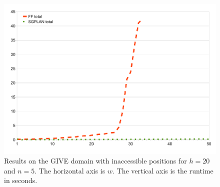 \begin{figure}
  \centering
  \includegraphics[width=0.85\columnwidth]{graph-exp4}
  \caption{Results on the GIVE domain with inaccessible
    positions for $h=20$ and $n=5$. The horizontal axis is $w$.
    The vertical axis is the runtime in seconds.}
  \label{fig:give-runtime-nosoln}
\end{figure}



